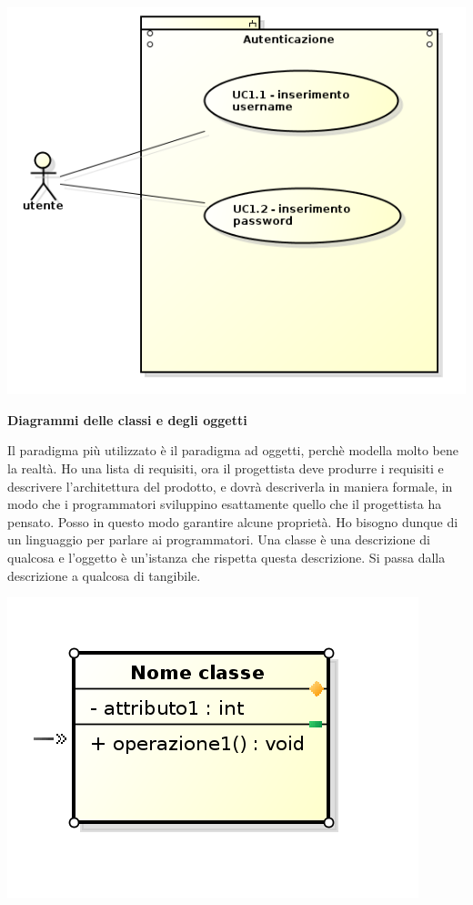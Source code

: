 \begin{center}

\includegraphics[width=0.75\columnwidth]{img5} %

\end{center}

\textbf{Diagrammi delle classi e degli oggetti}

Il paradigma più utilizzato è il paradigma ad oggetti, perchè modella molto bene la realtà. Ho una lista di requisiti, ora il progettista deve produrre i requisiti e descrivere l'architettura del prodotto, e dovrà descriverla in maniera formale, in modo che i programmatori sviluppino esattamente quello che il progettista ha pensato. Posso in questo modo garantire alcune proprietà. Ho bisogno dunque di un linguaggio per parlare ai programmatori. Una classe è una descrizione di qualcosa e l'oggetto è un'istanza che rispetta questa descrizione. Si passa dalla descrizione a qualcosa di tangibile.

\begin{center}

\includegraphics[width=0.75\columnwidth]{img6} %

\end{center}

